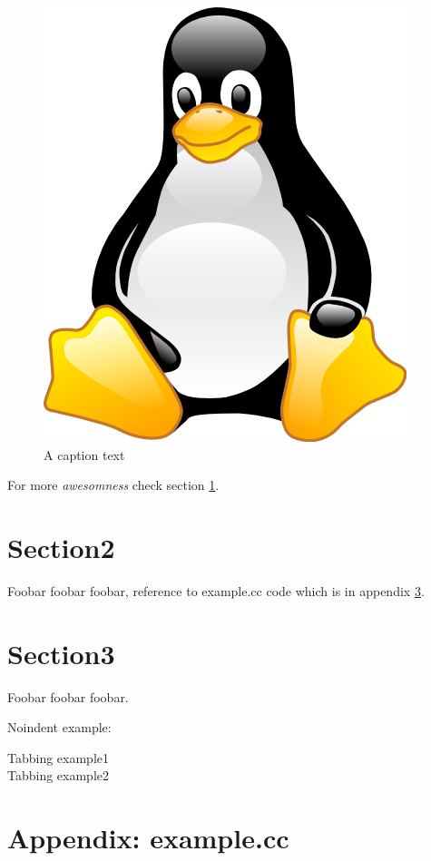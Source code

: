 \documentclass[a4paper,11pt]{article}
\begin{document}
\begin{figure}[!ht]
\centering
\includegraphics[width=\textwidth]{img/example.png}
\caption{A caption text}
\label{figure:aReferenceToAPic}
\end{figure}

For more \emph{awesomness} check section \ref{section:RefToSection2}.

\section{Section2}
\label{section:RefToSection2}

Foobar foobar foobar, reference to example.cc code which is in appendix \ref{appendix:example.cc}.


\clearpage


\clearpage


\section{Section3}
\label{section:RefToSection3}
Foobar foobar foobar.

\noindent
Noindent example:
\begin{tabbing}
Tabbing example1\\
Tabbing example2
\end{tabbing}


\appendix
\clearpage
\section{Appendix: example.cc}
\label{appendix:example.cc}
\inputminted{c++}{./example.cc}
\end{document}
